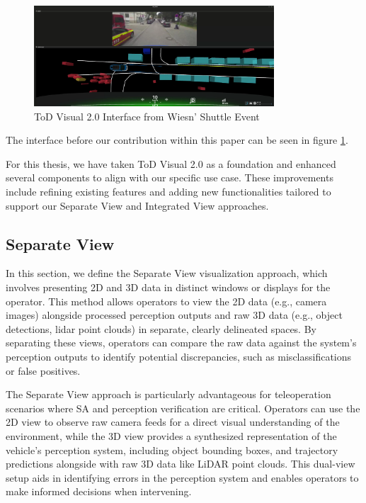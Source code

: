 \begin{figure}
    \includegraphics[width=0.8\textwidth]{figures/tod_visual.png}
    \centering
    \caption{ToD Visual 2.0 Interface from Wiesn' Shuttle Event}
    \label{fig:ToDVisual}
\end{figure}

The interface before our contribution within this paper can be seen in figure \ref{fig:ToDVisual}.

For this thesis, we have taken ToD Visual 2.0 as a foundation and enhanced several components to align with our specific use case. These improvements include refining existing features and adding new functionalities tailored to support our Separate View and Integrated View approaches.


\subsection{Separate View}\label{section:separateview}
In this section, we define the Separate View visualization approach, which involves presenting 2D and 3D data in distinct windows or displays for the operator. This method allows operators to view the 2D data (e.g., camera images) alongside processed perception outputs and raw 3D data (e.g., object detections, lidar point clouds) in separate, clearly delineated spaces. By separating these views, operators can compare the raw data against the system's perception outputs to identify potential discrepancies, such as misclassifications or false positives.

The Separate View approach is particularly advantageous for teleoperation scenarios where \ac{SA} and perception verification are critical. Operators can use the 2D view to observe raw camera feeds for a direct visual understanding of the environment, while the 3D view provides a synthesized representation of the vehicle's perception system, including object bounding boxes, and trajectory predictions alongside with raw 3D data like LiDAR point clouds. This dual-view setup aids in identifying errors in the perception system and enables operators to make informed decisions when intervening.

